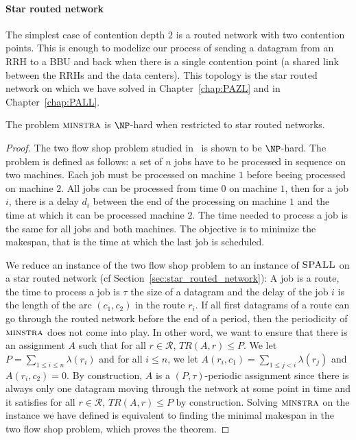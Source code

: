 \paragraph*{Star routed network}

The simplest case of contention depth $2$ is a routed network with two contention points. 
This is enough to modelize our process of sending a datagram from an RRH to a BBU and back when
there is a single contention point (a shared link between the RRHs and the data centers). 
This topology is the star routed network on which we have solved \pazl in Chapter~\ref{chap:PAZL} and \pall in Chapter~\ref{chap:PALL}.


 \begin{theorem}\label{th:spallHard}
The problem $\textsc{minstra}$ is $\NP$-hard when restricted to star routed networks.
\end{theorem}
\begin{proof}
The two flow shop problem studied in~\cite{yu2004minimizing} is shown to be $\NP$-hard. The problem is defined as follows: a set of $n$ jobs have to be processed in sequence on two machines. Each job must be processed on machine $1$ before beeing processed on machine $2$. All jobs can be processed from time $0$ on machine $1$, then for a job $i$, there is a delay $d_i$ between the end of the processing on machine $1$ and the time at which it can be processed machine $2$.  The time needed to process a job is the same for all jobs and both machines. The objective is to minimize the makespan, that is the time at which the last job is scheduled.

We reduce an instance of the two flow shop problem to an instance of $\textsc{SPALL}$ on a star routed network (cf Section~\ref{sec:star_routed_network}): A job is a route, the time to process a job is $\tau$ the size of a datagram and 
 the delay of the job $i$ is the length of the arc $(c_1,c_2)$ in the route $r_i$. If all first datagrams of a route can 
 go through the routed network before the end of a period, then the periodicity of $\textsc{minstra}$ does not come into play.
 In other word, we want to ensure that there is an assignment $A$ such that for all $r \in \mathcal{R}$, $TR(A,r) \leq P$.
 We let $P = \sum_{1 \leq i\leq n} \lambda(r_i)$ and for all $i \leq n$, we let $A(r_i,c_1) = \sum_{1 \leq j < i} \lambda(r_j)$ and $A(r_i,c_2)=0$. By construction, $A$ is a $(P,\tau)$-periodic assignment since there is always only one datagram
 moving through the network at some point in time and it satisfies  for all $r \in \mathcal{R}$, $TR(A,r) \leq P$ by construction.
 Solving $\textsc{minstra}$ on the instance we have defined is equivalent to finding the minimal makespan in the two flow shop problem, which proves the theorem.
\end{proof}



